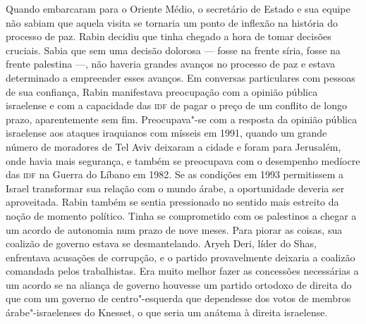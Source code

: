 Quando embarcaram para o Oriente Médio, o secretário de Estado e sua
equipe não sabiam que aquela visita se tornaria um ponto de inflexão na
história do processo de paz. Rabin decidiu que tinha chegado a hora de
tomar decisões cruciais. Sabia que sem uma decisão dolorosa --- fosse na
frente síria, fosse na frente palestina ---, não haveria grandes avanços
no processo de paz e estava determinado a empreender esses avanços. Em
conversas particulares com pessoas de sua confiança, Rabin manifestava
preocupação com a opinião pública israelense e com a capacidade das \textsc{idf}
de pagar o preço de um conflito de longo prazo, aparentemente sem fim.
Preocupava"-se com a resposta da opinião pública israelense aos ataques
iraquianos com mísseis em 1991, quando um grande número de moradores de
Tel Aviv deixaram a cidade e foram para Jerusalém, onde havia mais
segurança, e também se preocupava com o desempenho medíocre das \textsc{idf} na
Guerra do Líbano em 1982. Se as condições em 1993 permitissem a Israel
transformar sua relação com o mundo árabe, a oportunidade deveria ser
aproveitada. Rabin também se sentia pressionado no sentido mais estreito
da noção de momento político. Tinha se comprometido com os palestinos a
chegar a um acordo de autonomia num prazo de nove meses. Para piorar as
coisas, sua coalizão de governo estava se desmantelando. Aryeh Deri,
líder do Shas, enfrentava acusações de corrupção, e o partido
provavelmente deixaria a coalizão comandada pelos trabalhistas. Era
muito melhor fazer as concessões necessárias a um acordo se na aliança
de governo houvesse um partido ortodoxo de direita do que com um governo
de centro"-esquerda que dependesse dos votos de membros árabe"-israelenses
do Knesset, o que seria um anátema à direita israelense.

